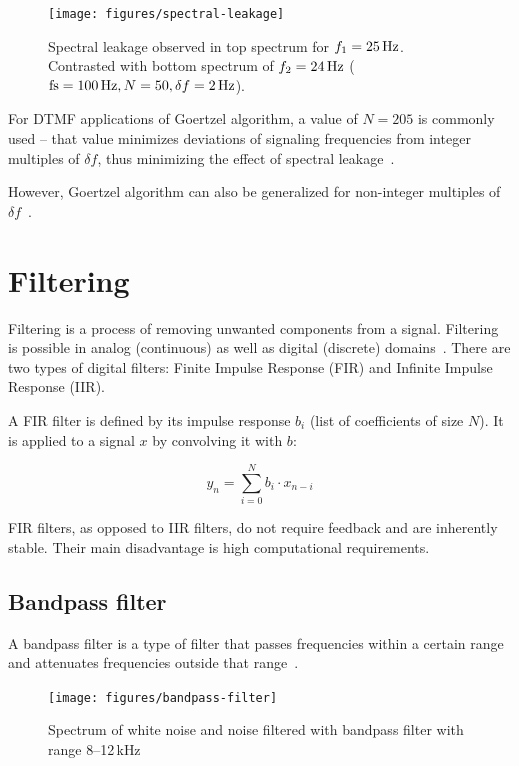 \documentclass[english,bachelor,a4paper,oneside]{ppfcmthesis}
\begin{document}
\begin{figure}[H]
  \centering
  \texttt{[image: figures/spectral-leakage]}
  \caption[Spectral leakage in magnitude spectrum]{Spectral leakage observed in top spectrum for $f_{1} = \textrm{25\,Hz}$. Contrasted with bottom spectrum of $f_{2} = \textrm{24\,Hz}$ ($\textrm{fs} = \textrm{100\,Hz}, N = 50, \delta f = \textrm{2\,Hz}$).}
  \label{fig:spectral-leakage}
\end{figure}

For DTMF applications of Goertzel algorithm, a value of $N = 205$ is commonly used -- that value minimizes deviations of signaling frequencies from integer multiples of $\delta f$, thus minimizing the effect of spectral leakage~\cite{DTMF}.

However, Goertzel algorithm can also be generalized for non-integer multiples of $\delta f$~\cite{PS12}.

\section{Filtering}

Filtering is a process of removing unwanted components from a signal. Filtering is possible in analog (continuous) as well as digital (discrete) domains~\cite{DSPGuide}.
There are two types of digital filters: Finite Impulse Response (FIR) and Infinite Impulse Response (IIR).

A FIR filter is defined by its impulse response $b_i$ (list of coefficients of size $N$). It is applied to a signal $x$ by convolving it with $b$:

\begin{equation}
y_{n} = \sum_{i = 0}^{N} b_{i}\cdot x_{n-i}
\end{equation}

FIR filters, as opposed to IIR filters, do not require feedback and are inherently stable. Their main disadvantage is high computational requirements.

\subsection{Bandpass filter}

A bandpass filter is a type of filter that passes frequencies within a certain range and attenuates frequencies outside that range~\cite{JOSFilters}.

\begin{figure}[h]
  \centering
  \texttt{[image: figures/bandpass-filter]}
  \caption[Effect of a bandpass filter]{Spectrum of white noise and noise filtered with bandpass filter with range 8--12\,kHz}
  \label{fig:bandpass}
\end{figure}
\end{document}
